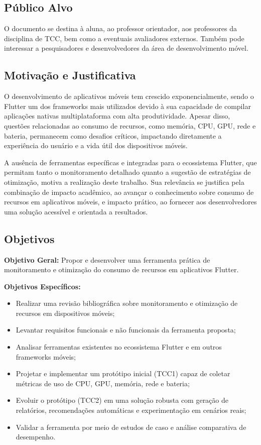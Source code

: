 \documentclass[12pt,a4paper]{article}
\begin{document}
\subsection{Público Alvo}
O documento se destina à aluna, ao professor orientador, aos professores da disciplina de TCC, bem como a eventuais avaliadores externos. Também pode interessar a pesquisadores e desenvolvedores da área de desenvolvimento móvel.

\subsection{Motivação e Justificativa}
O desenvolvimento de aplicativos móveis tem crescido exponencialmente, sendo o Flutter um dos frameworks mais utilizados devido à sua capacidade de compilar aplicações nativas multiplataforma com alta produtividade. Apesar disso, questões relacionadas ao consumo de recursos, como memória, CPU, GPU, rede e bateria, permanecem como desafios críticos, impactando diretamente a experiência do usuário e a vida útil dos dispositivos móveis.

A ausência de ferramentas específicas e integradas para o ecossistema Flutter, que permitam tanto o monitoramento detalhado quanto a sugestão de estratégias de otimização, motiva a realização deste trabalho. Sua relevância se justifica pela combinação de impacto acadêmico, ao avançar o conhecimento sobre consumo de recursos em aplicativos móveis, e impacto prático, ao fornecer aos desenvolvedores uma solução acessível e orientada a resultados.

\subsection{Objetivos}
\textbf{Objetivo Geral:}  
Propor e desenvolver uma ferramenta prática de monitoramento e otimização do consumo de recursos em aplicativos Flutter.

\textbf{Objetivos Específicos:}
\begin{itemize}
    \item Realizar uma revisão bibliográfica sobre monitoramento e otimização de recursos em dispositivos móveis;
    \item Levantar requisitos funcionais e não funcionais da ferramenta proposta;
    \item Analisar ferramentas existentes no ecossistema Flutter e em outros frameworks móveis;
    \item Projetar e implementar um protótipo inicial (TCC1) capaz de coletar métricas de uso de CPU, GPU, memória, rede e bateria;
    \item Evoluir o protótipo (TCC2) em uma solução robusta com geração de relatórios, recomendações automáticas e experimentação em cenários reais;
    \item Validar a ferramenta por meio de estudos de caso e análise comparativa de desempenho.
\end{itemize}
\end{document}
